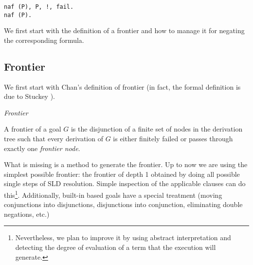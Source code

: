 \documentclass{llncs}
\begin{document}
\begin{verbatim}
naf (P), P, !, fail.
naf (P).
\end{verbatim}

We first start with the definition of a frontier and how to manage it for
negating the corresponding formula.


\subsection{Frontier}
\label{frontier}

We first start with Chan's definition of frontier (in fact, 
the formal definition is due to Stuckey \cite{Stuckey95}). 

\begin{definition}{\em Frontier}

A frontier of a goal $G$ is the disjunction of a finite set of nodes
in the derivation tree such that every derivation of $G$ is either
finitely failed or passes through exactly one {\em frontier node}.
\end{definition}

What is missing is a method to generate the frontier.  Up to now we
are using the simplest possible frontier: the frontier of depth 1
obtained by doing all possible single steps of SLD resolution. Simple
inspection of the applicable clauses can do this\footnote{Nevertheless, we
plan to improve it by using abstract interpretation and
detecting the degree of evaluation of a term that the execution will
generate.}.
Additionally, built-in based goals have a special
treatment (moving conjunctions into disjunctions, disjunctions into
conjunction, eliminating double negations, etc.)
\end{document}
